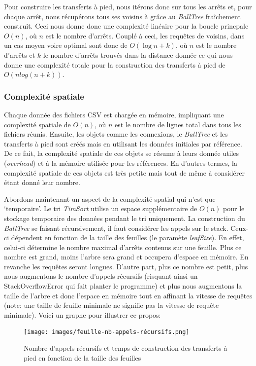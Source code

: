 \documentclass[12pt]{article}
\begin{document}
Pour construire les transferts à pied, nous itérons donc sur tous les arrêts et, pour chaque arrêt, nous récupérons tous ses voisins à grâce au \emph{BallTree} fraîchement construit. Ceci nous donne donc une complexité
linéaire pour la boucle princpale $O(n)$, où $n$ est le nombre d'arrêts. Couplé à ceci, les requêtes de voisins, dans un cas moyen voire optimal sont donc de $O(\log n + k)$, où $n$ est le nombre d'arrêts 
et $k$ le nombre d'arrêts trouvés dans la distance donnée ce qui nous donne une complexité totale pour la construction des transferts à pied de $O(nlog(n + k))$.


\subsubsection{Complexité spatiale}
Chaque donnée des fichiers CSV est chargée en mémoire, impliquant une complexité spatiale de $O(n)$, où $n$ est le nombre de lignes total dans tous les fichiers réunis. Ensuite, les objets
comme les connexions, le \emph{BallTree} et les transferts à pied sont créés mais en utilisant les données initiales par référence. De ce fait, la complexité spatiale de ces objets se résume à leurs
donnée utiles (\emph{overhead}) et à la mémoire utilisée pour les références. En d'autres termes, la complexité spatiale de ces objets est très petite mais tout de même à considérer étant donné leur nombre.

Abordons maintenant un aspect de la complexité spatial qui n'est que `temporaire'. Le tri \emph{TimSort} utilise un espace supplémentaire de $O(n)$ pour le stockage temporaire des données pendant le tri uniquement.
La construction du \emph{BallTree} se faisant récursivement, il faut considérer les appels sur le stack. Ceux-ci dépendent en fonction de la taille des feuilles (le paramète \emph{leafSize}). En effet, celui-ci
détermine le nombre maximal d'arrêts contenus sur une feuille. Plus ce nombre est grand, moins l'arbre sera grand et occupera d'espace en mémoire. En revanche les requêtes seront longues. D'autre part, plus ce nombre est petit,
plus nous augmentons le nombre d'appels récursifs (risquant ainsi un StackOverflowError qui fait planter le programme) et plus nous augmentons la taille de l'arbre et donc l'espace en mémoire tout en affinant la vitesse de
requêtes (note: une taille de feuille minimale ne signifie pas la vitesse de requête minimale). Voici un graphe pour illustrer ce propos:

\begin{figure}[h]
    \centering
    \texttt{[image: images/feuille-nb-appels-récursifs.png]}
    \caption{Nombre d'appels récursifs et temps de construction des transferts à pied en fonction de la taille des feuilles}
\end{figure}
\end{document}
